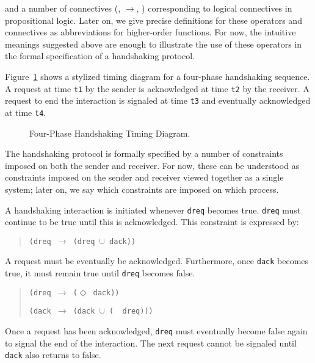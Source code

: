 \noindent
and a number of connectives
({\TLNot}, $\longrightarrow$, {\TLAnd})
corresponding to logical connectives in propositional logic.
Later on, we give precise definitions for these operators and
connectives as abbreviations for higher-order functions.
For now, the intuitive meanings suggested above are enough to
illustrate the use of these operators in the formal
specification of a handshaking protocol.

Figure~\ref{fig-style} shows a stylized timing diagram for a four-phase
handshaking sequence.
A request at time \verb"t1"
by the sender is acknowledged at time \verb"t2" by the receiver.
A request to end the interaction is signaled at time \verb"t3"
and eventually acknowledged at time \verb"t4".

\begin{figure}
\begin{center}


\caption{Four-Phase Handshaking Timing Diagram.}
\label{fig-style}
\end{center}
\end{figure}

The handshaking protocol is formally specified by a number of
constraints imposed on both the sender and receiver.
For now, these can be understood as constraints imposed on the
sender and receiver viewed together as a single system;
later on, we say which constraints are imposed on which process.

A handshaking interaction is initiated whenever
\verb"dreq" becomes true.
\verb"dreq" must continue to be true until this is acknowledged.
This constraint is expressed by:

\begin{quote}
\verb"(dreq "$\longrightarrow$\verb" (dreq "$\cup$\verb" dack))"
\end{quote}

A request must be eventually be acknowledged. Furthermore,
once \verb"dack" becomes true, it must remain true until
\verb"dreq" becomes false.

\begin{quote}
\verb"(dreq "$\longrightarrow$\verb" ("$\Diamond$\verb" dack))"

\verb"(dack "$\longrightarrow$\verb" (dack "$\cup$\verb" ("{\TLNot}\verb"  dreq)))"
\end{quote}

Once a request has been acknowledged,
\verb"dreq" must eventually become false again to signal
the end of the interaction.
The next request cannot be signaled until \verb"dack" also returns
to false.

